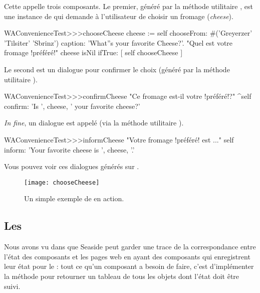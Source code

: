 \documentclass[a4paper,10pt,twoside]{book}
\begin{document}
Cette \task appelle trois composants.
Le premier, généré par la méthode utilitaire
, est une instance de
 qui demande à l'utilisateur de choisir un
fromage (\emph{cheese}).

\begin{code}{}
WAConvenienceTest>>>chooseCheese
	cheese := self
		chooseFrom: #('Greyerzer' 'Tilsiter' 'Sbrinz')
		caption: 'What''s your favorite Cheese?'. "Quel est votre fromage !préféré!"
	cheese isNil ifTrue: [ self chooseCheese ]
\end{code}


Le second est un dialogue  pour confirmer le
choix (généré par la méthode utilitaire ).

\begin{code}{}
WAConvenienceTest>>>confirmCheese
    "Ce fromage est-il votre !préféré!?"
	^self confirm: 'Is ', cheese,  ' your favorite cheese?'
\end{code}

\emph{In fine}, un dialogue  est appelé (via la
méthode utilitaire ).

\begin{code}{}
WAConvenienceTest>>>informCheese
    "Votre fromage !préféré! est ..."
	self inform: 'Your favorite cheese is ', cheese, '.'
\end{code}

Vous pouvez voir ces dialogues générés sur .

\begin{figure}[ht]
\begin{center}
\texttt{[image: chooseCheese]}
\caption{Un simple exemple de \task en action.}
\end{center}
\end{figure}

\subsection{Les \transactions} %

Nous avons vu dans  que Seaside peut garder une
trace de la correspondance entre l'état des composants et les pages
web en ayant des composants qui enregistrent leur état pour le
\backtracking:
tout ce qu'un composant a besoin de faire, c'est d'implémenter la
méthode  pour retourner un tableau de tous les objets dont
l'état doit être suivi.
\end{document}
